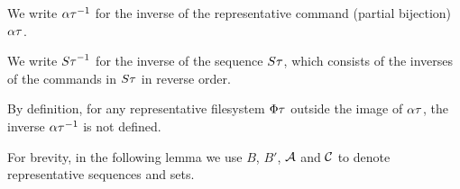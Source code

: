 
\begin{mydef}
We write $\alpha\tau^{-1}$ for
the inverse of the representative command (partial bijection) $\alpha\tau$.

We write ${S\tau}^{-1}$ for the inverse of the sequence $S\tau$, which consists of the inverses of the commands in $S\tau$
in reverse order.
\end{mydef}
By definition, for any representative filesystem $\Phi\tau$ outside the image of $\alpha\tau$, the inverse $\alpha\tau^{-1}$ is not defined.


For brevity, in the following lemma we use $B$, $B'$, $\mathcal{A}$ and $\mathcal{C}$ to denote
representative sequences and sets.

\newcommand{\ia}{\sqs{A}}
\newcommand{\ic}{\sqs{C}}
\newcommand{\ibi}{B^{-1}}

